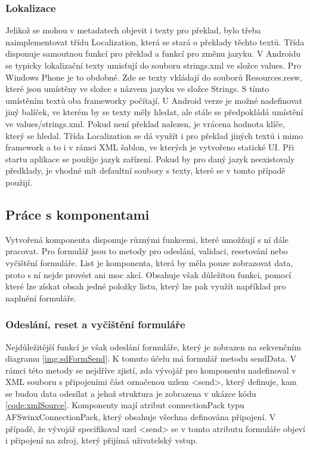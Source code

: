 \subsubsection{Lokalizace}
Jelikož se mohou v metadatech objevit i texty pro překlad, bylo třeba naimplementovat třídu Localization, která se stará o překlady těchto textů. Třída disponuje samoutnou funkcí pro překlad a funkcí pro změnu jazyku. V Androidu se typicky lokalizační texty umisťují do souboru strings.xml ve složce values. Pro Windows Phone je to obdobné. Zde se texty vkládají do souborů Resources.resw, které jsou umístěny ve složce s názvem jazyku ve složce Strings. S tímto umístěním textů oba frameworky počítají. U Android verze je možné nadefinovat jiný balíček, ve kterém by se texty měly hledat, ale stále se předpokládá umístění ve values/strings.xml. Pokud není překlad nalezen, je vrácena hodnota klíče, který se hledal. Třída Localization se dá využít i pro překlad jiných textů i mimo framework a to i v rámci XML šablon, ve kterých je vytvořeno statické UI. Při startu aplikace se použije jazyk zařízení. Pokud by pro daný jazyk neexistovaly předklady, je vhodné mít defaultní soubory s texty, které se v tomto případě použijí.

\subsection{Práce s komponentami}
Vytvořená komponenta disponuje různými funkcemi, které umožňují s ní dále pracovat. Pro formulář jsou to metody pro odeslání, validaci, resetování nebo vyčištění formuláře. List je komponenta, která by měla pouze zobrazovat data, proto s ní nejde provést ani moc akcí. Obsahuje však důležitou funkci, pomocí které lze získat obsah jedné položky listu, který lze pak využít například pro naplnění formuláře. 

\subsubsection{Odeslání, reset a vyčištění formuláře}
Nejdůležitější funkcí je však odeslání formuláře, který je zobrazen na sekvenčním diagramu \ref{img:sdFormSend}. K tomuto účelu má formulář metodu sendData. V rámci této metody se nejdříve zjistí, zda vývojář pro komponentu nadefinoval v XML souboru s připojeními část označenou uzlem <send>, který definuje, kam se budou data odesílat a jehož struktura je zobrazena v ukázce kódu \ref{code:xmlSource}. Komponenty mají atribut connectionPack typu AFSwinxConnectionPack, který obsahuje všechna definována připojení. V případě, že vývojář specifikoval uzel <send> se v tomto atributu formuláře objeví i připojení na zdroj, který přijímá uživatelský vstup. 

